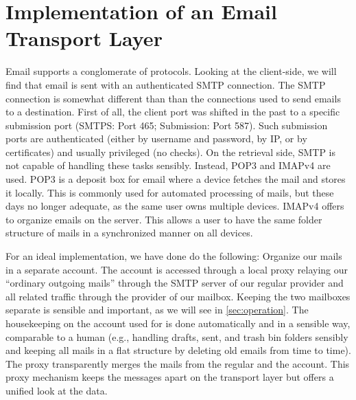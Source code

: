 \section{Implementation of an Email Transport Layer}
Email supports a conglomerate of protocols. Looking at the client-side, we will find that email is sent with an authenticated SMTP connection. The SMTP connection is somewhat different than than the connections used to send emails to a destination. First of all, the client port was shifted in the past to a specific submission port (SMTPS: Port 465; Submission: Port 587). Such submission ports are authenticated (either by username and password, by IP, or by certificates) and usually privileged (no  checks). On the retrieval side, SMTP is not capable of handling these tasks sensibly. Instead, POP3 and IMAPv4 are used. POP3 is a deposit box for email where a device fetches the mail and stores it locally. This is commonly used for automated processing of mails, but these days no longer adequate, as the same user owns multiple devices. IMAPv4 offers to organize emails on the server. This allows a user to have the same folder structure of mails in a synchronized manner on all devices.

For an ideal implementation, we have done do the following: Organize our \MessageVortex{} mails in a separate account. The account is accessed through a local proxy relaying our ``ordinary outgoing mails'' through the SMTP server of our regular provider and all \MessageVortex{} related traffic through the provider of our \MessageVortex{} mailbox. Keeping the two mailboxes separate is sensible and important, as we will see in \cref{sec:operation}. The housekeeping on the account used for \MessageVortex{} is done automatically and in a sensible way, comparable to a human (e.g., handling drafts, sent, and trash bin folders sensibly and keeping all mails in a flat structure by deleting old emails from time to time). The proxy transparently merges the mails from the regular and the \MessageVortex{} account. This proxy mechanism keeps the messages apart on the transport layer but offers a unified look at the data.

